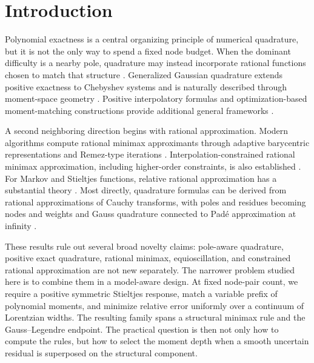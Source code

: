 \documentclass[preprint,12pt]{elsarticle}
\theoremstyle{remark}
\begin{document}
\section{Introduction}

Polynomial exactness is a central organizing principle of numerical
quadrature, but it is not the only way to spend a fixed node budget.
When the dominant difficulty is a nearby pole, quadrature may instead
incorporate rational functions chosen to match that structure
\cite{gautschi1993}. Generalized Gaussian quadrature extends positive
exactness to Chebyshev systems and is naturally described through
moment-space geometry \cite{huybrechs2017}. Positive interpolatory
formulas and optimization-based moment-matching constructions provide
additional general frameworks \cite{vandebos2019,glaubitz2020,
keshavarzzadeh2018}.

A second neighboring direction begins with rational approximation.
Modern algorithms compute rational minimax approximants through adaptive
barycentric representations and Remez-type iterations
\cite{filip2018}. Interpolation-constrained rational minimax
approximation, including higher-order constraints, is also established
\cite{zhang2025}. For Markov and Stieltjes functions, relative rational
approximation has a substantial theory \cite{beckermann2021}. Most
directly, quadrature formulas can be derived from rational
approximations of Cauchy transforms, with poles and residues becoming
nodes and weights and Gauss quadrature connected to Pad\'e approximation
at infinity \cite{horning2025}.

These results rule out several broad novelty claims: pole-aware
quadrature, positive exact quadrature, rational minimax,
equioscillation, and constrained rational approximation are not new
separately. The narrower problem studied here is to combine them in a
model-aware design. At fixed node-pair count, we require a positive
symmetric Stieltjes response, match a variable prefix of polynomial
moments, and minimize relative error uniformly over a continuum of
Lorentzian widths. The resulting family spans a structural minimax rule
and the Gauss--Legendre endpoint. The practical question is then not
only how to compute the rules, but how to select the moment depth when a
smooth uncertain residual is superposed on the structural component.
\end{document}
